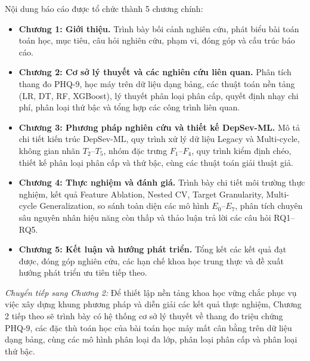 Nội dung báo cáo được tổ chức thành 5 chương chính:
\begin{itemize}
    \item \textbf{Chương 1: Giới thiệu.} Trình bày bối cảnh nghiên cứu, phát biểu bài toán toán học, mục tiêu, câu hỏi nghiên cứu, phạm vi, đóng góp và cấu trúc báo cáo.
    \item \textbf{Chương 2: Cơ sở lý thuyết và các nghiên cứu liên quan.} Phân tích thang đo PHQ-9, học máy trên dữ liệu dạng bảng, các thuật toán nền tảng (LR, DT, RF, XGBoost), lý thuyết phân loại phân cấp, quyết định nhạy chi phí, phân loại thứ bậc và tổng hợp các công trình liên quan.
    \item \textbf{Chương 3: Phương pháp nghiên cứu và thiết kế DepSev-ML.} Mô tả chi tiết kiến trúc DepSev-ML, quy trình xử lý dữ liệu Legacy và Multi-cycle, không gian nhãn $T_2$--$T_5$, nhóm đặc trưng $F_1$--$F_4$, quy trình kiểm định chéo, thiết kế phân loại phân cấp và thứ bậc, cùng các thuật toán giải thuật giả.
    \item \textbf{Chương 4: Thực nghiệm và đánh giá.} Trình bày chi tiết môi trường thực nghiệm, kết quả Feature Ablation, Nested CV, Target Granularity, Multi-cycle Generalization, so sánh toàn diện các mô hình $E_0$--$E_7$, phân tích chuyên sâu nguyên nhân hiệu năng còn thấp và thảo luận trả lời các câu hỏi RQ1--RQ5.
    \item \textbf{Chương 5: Kết luận và hướng phát triển.} Tổng kết các kết quả đạt được, đóng góp nghiên cứu, các hạn chế khoa học trung thực và đề xuất hướng phát triển ưu tiên tiếp theo.
\end{itemize}

\vspace{0.5cm}
\noindent \textit{Chuyển tiếp sang Chương 2:} Để thiết lập nền tảng khoa học vững chắc phục vụ việc xây dựng khung phương pháp và diễn giải các kết quả thực nghiệm, Chương 2 tiếp theo sẽ trình bày có hệ thống cơ sở lý thuyết về thang đo triệu chứng PHQ-9, các đặc thù toán học của bài toán học máy mất cân bằng trên dữ liệu dạng bảng, cùng các mô hình phân loại đa lớp, phân loại phân cấp và phân loại thứ bậc.
\cleardoublepage
